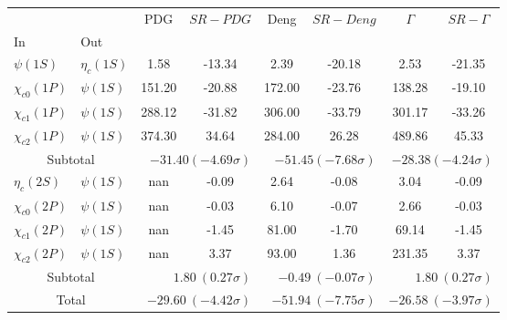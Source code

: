 \begin{tabular}{|l|l|c|c|c|c|c|c|}%
\hline%
&&PDG&$SR-PDG$&Deng&$SR-Deng$&$\Gamma$&$SR-\Gamma$\\%
In&Out&&&&&&\\%
\hline%
$\psi(1S)$&$\eta_{c}(1S)$&1.58&-13.34&2.39&-20.18&2.53&-21.35\\%
$\chi_{c0}(1P)$&$\psi(1S)$&151.20&-20.88&172.00&-23.76&138.28&-19.10\\%
$\chi_{c1}(1P)$&$\psi(1S)$&288.12&-31.82&306.00&-33.79&301.17&-33.26\\%
$\chi_{c2}(1P)$&$\psi(1S)$&374.30&34.64&284.00&26.28&489.86&45.33\\%
\hline%
\hline%
\multicolumn{2}{|c|}{Subtotal}&\multicolumn{2}{|r|}{$-31.40 (-4.69\sigma)$}&\multicolumn{2}{|r|}{$-51.45 (-7.68\sigma)$}&\multicolumn{2}{|r|}{$-28.38 (-4.24\sigma)$}\\%
\hline%
\hline%
$\eta_{c}(2S)$&$\psi(1S)$&nan&-0.09&2.64&-0.08&3.04&-0.09\\%
$\chi_{c0}(2P)$&$\psi(1S)$&nan&-0.03&6.10&-0.07&2.66&-0.03\\%
$\chi_{c1}(2P)$&$\psi(1S)$&nan&-1.45&81.00&-1.70&69.14&-1.45\\%
$\chi_{c2}(2P)$&$\psi(1S)$&nan&3.37&93.00&1.36&231.35&3.37\\%
\hline%
\hline%
\multicolumn{2}{|c|}{Subtotal}&\multicolumn{2}{|r|}{$1.80~(0.27\sigma)$}&\multicolumn{2}{|r|}{$-0.49~(-0.07\sigma)$}&\multicolumn{2}{|r|}{$1.80~(0.27\sigma)$}\\%
\hline%
\hline%
\multicolumn{2}{|c|}{Total}&\multicolumn{2}{|r|}{$-29.60~(-4.42\sigma)$}&\multicolumn{2}{|r|}{$-51.94~(-7.75\sigma)$}&\multicolumn{2}{|r|}{$-26.58~(-3.97\sigma)$}\\%
\hline%
\end{tabular}